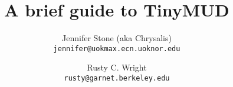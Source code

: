 
\newcommand{\bs}{\char '134}	%
\newcommand{\ub}{\char '137}	%
\newcommand{\ua}{\char '136}	%
\newcommand{\qt}{\char '175}	%
\newcommand{\tl}{\char '176}	%
\newcommand{\sh}{\char '043}	%

\newcommand{\tinymud}{{\small Tiny}{MUD}}
\newcommand{\type}[1]{{\tt #1\/}}

\newenvironment{simple}{\begin{list}%
{\relax}%
{\setlength{\labelwidth}{0pt}%
 \setlength{\labelsep}{0pt}%
 \setlength{\leftmargin}{0pt}%
 \setlength{\listparindent}{0pt}}}%
{\end{list}}



\setlength{\rulewidth}{\textwidth}

\newcommand{\dorule}{\begin{center}
\rule{\rulewidth}{1pt}
\end{center}}

\makeindex

\title{{\bf A brief guide to {\large\bf Tiny}MUD}}

\author{Jennifer Stone (aka Chrysalis) \\
{\tt jennifer@uokmax.ecn.uoknor.edu}
\and
Rusty C. Wright \\
{\tt rusty@garnet.berkeley.edu}}




\RaggedRight


\maketitle

\tableofcontents
\clearpage



